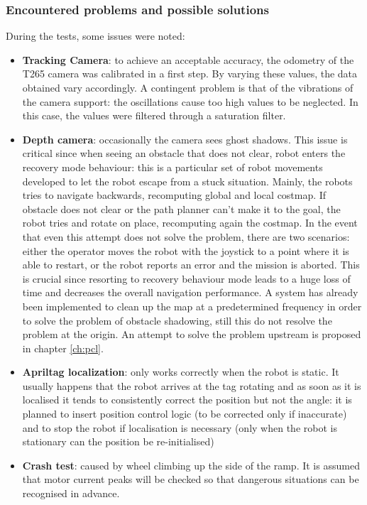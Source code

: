 \subsubsection{Encountered problems and possible solutions}
During the tests, some issues were noted:
\begin{itemize}
    \item \textbf{Tracking Camera}: to achieve an acceptable accuracy, the odometry of the T265 camera was calibrated in a first step. By varying these values, the data obtained vary accordingly. A contingent problem is that of the vibrations of the camera support: the oscillations cause too high values to be neglected. In this case, the values were filtered through a saturation filter.
    \item \textbf{Depth camera}: occasionally the camera sees ghost shadows. This issue is critical since when seeing an obstacle that does not clear, robot enters the recovery mode behaviour: this is a particular set of robot movements developed to let the robot escape from a stuck situation. Mainly, the robots tries to navigate backwards, recomputing global and local costmap. If obstacle does not clear or the path planner can't make it to the goal, the robot tries and rotate on place, recomputing again the costmap. In the event that even this attempt does not solve the problem, there are two scenarios: either the operator moves the robot with the joystick to a point where it is able to restart, or the robot reports an error and the mission is aborted. This is crucial since resorting to recovery behaviour mode leads to a huge loss of time and decreases the overall navigation performance. A system has already been implemented to clean up the map at a predetermined frequency in order to solve the problem of obstacle shadowing, still this do not resolve the problem at the origin. An attempt to solve the problem upstream is proposed in chapter \ref{ch:pcl}.
    \item \textbf{Apriltag localization}: only works correctly when the robot is static. It usually happens that the robot arrives at the tag rotating and as soon as it is localised it tends to consistently correct the position but not the angle: it is planned to insert position control logic (to be corrected only if inaccurate) and to stop the robot if localisation is necessary (only when the robot is stationary can the position be re-initialised) 
    \item \textbf{Crash test}: caused by wheel climbing up the side of the ramp. It is assumed that motor current peaks will be checked so that dangerous situations can be recognised in advance.

\end{itemize}

